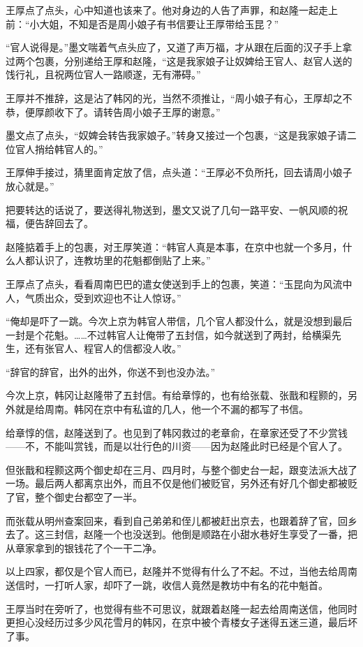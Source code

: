 王厚点了点头，心中知道也该来了。他对身边的人告了声罪，和赵隆一起走上前：“小大姐，不知是否是周小娘子有书信要让王厚带给玉昆？”

“官人说得是。”墨文喘着气点头应了，又道了声万福，才从跟在后面的汉子手上拿过两个包裹，分别递给王厚和赵隆，“这是我家娘子让奴婢给王官人、赵官人送的饯行礼，且祝两位官人一路顺遂，无有滞碍。”

王厚并不推辞，这是沾了韩冈的光，当然不须推让，“周小娘子有心，王厚却之不恭，便厚颜收下了。请转告周小娘子王厚的谢意。”

墨文点了点头，“奴婢会转告我家娘子。”转身又接过一个包裹，“这是我家娘子请二位官人捎给韩官人的。”

王厚伸手接过，猜里面肯定放了信，点头道：“王厚必不负所托，回去请周小娘子放心就是。”

把要转达的话说了，要送得礼物送到，墨文又说了几句一路平安、一帆风顺的祝福，便告辞回去了。

赵隆掂着手上的包裹，对王厚笑道：“韩官人真是本事，在京中也就一个多月，什么人都认识了，连教坊里的花魁都倒贴了上来。”

王厚点了点头，看看周南巴巴的遣女使送到手上的包裹，笑道：“玉昆向为风流中人，气质出众，受到欢迎也不让人惊讶。”

“俺却是吓了一跳。今次上京为韩官人带信，几个官人都没什么，就是没想到最后一封是个花魁。……不过韩官人让俺带了五封信，如今就送到了两封，给横渠先生，还有张官人、程官人的信都没人收。”

“辞官的辞官，出外的出外，你送不到也没办法。”

今次上京，韩冈让赵隆带了五封信。有给章惇的，也有给张载、张戬和程颢的，另外就是给周南。韩冈在京中有私谊的几人，他一个不漏的都写了书信。

给章惇的信，赵隆送到了。也见到了韩冈救过的老章俞，在章家还受了不少赏钱——不，不能叫赏钱，而是以壮行色的川资——因为赵隆此时已经是个官人了。

但张戬和程颢这两个御史却在三月、四月时，与整个御史台一起，跟变法派大战了一场。最后两人都离京出外，而且不仅是他们被贬官，另外还有好几个御史都被贬了官，整个御史台都空了一半。

而张载从明州查案回来，看到自己弟弟和侄儿都被赶出京去，也跟着辞了官，回乡去了。这三封信，赵隆一个也没送到。他倒是顺路在小甜水巷好生享受了一番，把从章家拿到的银钱花了个一干二净。

以上四家，都仅是个官人而已，赵隆并不觉得有什么了不起。不过，当他去给周南送信时，一打听人家，却吓了一跳，收信人竟然是教坊中有名的花中魁首。

王厚当时在旁听了，也觉得有些不可思议，就跟着赵隆一起去给周南送信，他同时更担心没经历过多少风花雪月的韩冈，在京中被个青楼女子迷得五迷三道，最后坏了事。

